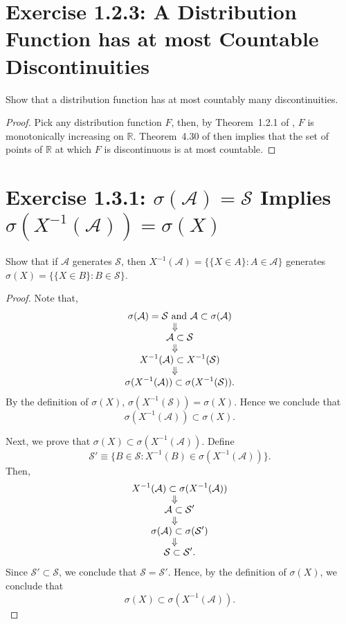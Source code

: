 \documentclass{amsbook}
\theoremstyle{definition}
\theoremstyle{remark}
\numberwithin{section}{chapter}
\numberwithin{equation}{chapter}
\begin{document}
\section{Exercise 1.2.3: A Distribution Function has at most Countable Discontinuities}
Show that a distribution function has at most countably many discontinuities.
\begin{proof}
Pick any distribution function $F$, then, by Theorem~1.2.1 of \cite{durrett2019probability}, $F$ is monotonically increasing on $\mathbb{R}$. Theorem~4.30 of \cite{rudin1976principles} then implies that the set of points of $\mathbb{R}$ at which $F$ is discontinuous is at most countable.
\end{proof}

\section{Exercise 1.3.1: $\sigma(\mathcal{A})=\mathcal{S}$ Implies $\sigma(X^{-1}(\mathcal{A}))=\sigma(X)$}
Show that if $\mathcal{A}$ generates $\mathcal{S}$, then $X^{-1}(\mathcal{A})=\{\{X\in A\}:A\in\mathcal{A}\}$ generates $\sigma(X)=\{\{X\in B\}:B\in\mathcal{S}\}$.
\begin{proof}
Note that,
\begin{gather*}
\sigma(\mathcal{A})=\mathcal{S}\text{ and }\mathcal{A}\subset\sigma(\mathcal{A})\\
\ArrowBetweenLines[\Downarrow]
\mathcal{A}\subset\mathcal{S}\\
\ArrowBetweenLines[\Downarrow]
X^{-1}(\mathcal{A})\subset X^{-1}(\mathcal{S})\\
\ArrowBetweenLines[\Downarrow]
\sigma(X^{-1}(\mathcal{A}))\subset\sigma(X^{-1}(\mathcal{S})).
\end{gather*}
By the definition of $\sigma(X)$, $\sigma(X^{-1}(\mathcal{S}))=\sigma(X)$. Hence we conclude that\[
\sigma(X^{-1}(\mathcal{A}))\subset\sigma(X).
\]

Next, we prove that $\sigma(X)\subset\sigma(X^{-1}(\mathcal{A}))$. Define\[
\mathcal{S}'\equiv\{B\in\mathcal{S}:X^{-1}(B)\in\sigma(X^{-1}(\mathcal{A}))\}.
\]Then,
\begin{gather*}
X^{-1}(\mathcal{A})\subset\sigma(X^{-1}(\mathcal{A}))\\
\ArrowBetweenLines[\Downarrow]
\mathcal{A}\subset\mathcal{S}'\\
\ArrowBetweenLines[\Downarrow]
\sigma(\mathcal{A})\subset\sigma(\mathcal{S}')\\
\ArrowBetweenLines[\Downarrow]
\mathcal{S}\subset\mathcal{S}'.
\end{gather*}
Since $\mathcal{S}'\subset\mathcal{S}$, we conclude that $\mathcal{S}=\mathcal{S}'$. Hence, by the definition of $\sigma(X)$, we conclude that\[
\sigma(X)\subset\sigma(X^{-1}(\mathcal{A})).
\]
\end{proof}
\end{document}

